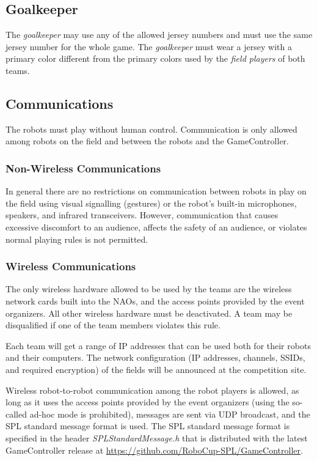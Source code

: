 \subsection{Goalkeeper}
\label{sec:goalkeeper}

The \emph{goalkeeper} may use any of the allowed jersey numbers and must use the same jersey number for the whole game. The \emph{goalkeeper} must wear a jersey with a primary color different from the primary colors used by the \emph{field players} of both teams.

\subsection{Communications}

The robots must play without human control. Communication is only allowed among robots on the field and between the robots and the GameController.

\subsubsection{Non-Wireless Communications}
\label{sec:acoustic}
In general there are no restrictions on communication between robots in play on the field using visual signalling (\eg gestures) or the robot's built-in microphones, speakers, and infrared transceivers. However, communication that causes excessive discomfort to an audience, affects the safety of an audience, or violates normal playing rules is not permitted.

\subsubsection{Wireless Communications}
\label{sec:wireless}
The only wireless hardware allowed to be used by the teams are the wireless network cards built into the NAOs, and the access points provided by the event organizers. All other wireless hardware must be deactivated. A team may be disqualified if one of the team members violates this rule.

Each team will get a range of IP addresses that can be used both for their robots and their computers. The network configuration (\eg IP addresses, channels, SSIDs, and required encryption) of the fields will be announced at the competition site.

Wireless robot-to-robot communication among the robot players is allowed, as long as it uses the access points provided by the event organizers (using the so-called ad-hoc mode is prohibited), messages are sent via UDP broadcast, and the SPL standard message format is used. The SPL standard message format is specified in the header \emph{SPLStandardMessage.h} that is distributed with the latest GameController release at \url{https://github.com/RoboCup-SPL/GameController}.


